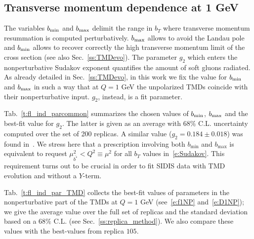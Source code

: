 \documentclass[aps,preprintnumbers,showpacs,nofootinbib,superscriptaddress,floatfix]{revtex4}
\begin{document}
\subsection{Transverse momentum dependence at 1 GeV}
\label{ss:bestfit_TMDs}

The variables $b_{\rm min}$ and $b_{\rm max}$ delimit the range in $b_T$ where transverse momentum resummation is computed perturbatively. $b_{\rm max}$ allows to avoid the Landau pole and $b_{\rm min}$ allows to recover correctly the high transverse momentum limit of the cross section (see also Sec.~\ref{ss:TMDevo}).
The parameter $g_2$ which enters the nonperturbative Sudakov exponent quantifies the amount of soft gluons radiated.
As already detailed in Sec.~\ref{ss:TMDevo}, in this work we fix the value for $b_{\rm min}$ and $b_{\rm max}$ in such a way that at $Q=1$ GeV the unpolarized TMDs coincide with their nonperturbative input. $g_2$, instead, is a fit parameter.

Tab.~\ref{t:fl_ind_parcommon} summarizes the chosen values of $b_{\rm min}$, $b_{\rm max}$ and the best-fit value for $g_2$. The latter is given as an average with $68\%$ C.L. uncertainty computed over the set of 200 replicas. A similar value ($g_2 = 0.184 \pm 0.018$) was found in~\cite{Konychev:2005iy}.
We stress here that a prescription involving both $b_{\text{min}}$ and $b_{\text{max}}$ is equivalent to request $\mu_{\bar{b^*}}^2 < Q^2 \equiv \mu^2$ for all $b_T$ values in~\eqref{e:Sudakov}. This requirement turns out to be crucial in order to fit SIDIS data with TMD evolution and without a $Y$-term.

Tab.~\ref{t:fl_ind_par_TMD} collects the best-fit values of parameters in the nonperturbative part of the TMDs at $Q=1$ GeV (see~\eqref{e:f1NP} and~\eqref{e:D1NP}); we give the average value over the full set of replicas and the standard deviation based on a $68\%$ C.L. (see Sec.~\ref{ss:replica_method}). 
We also compare these values with the best-values from replica $105$.
\end{document}
